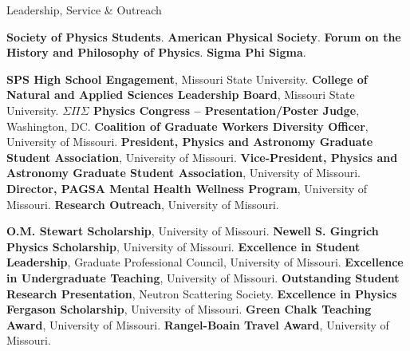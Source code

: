 \begin{rubric}{Leadership, Service \& Outreach}

\entry*[2017--2021] \textbf{Society of Physics Students}.
\entry*[2019--Present] \textbf{American Physical Society}.
\entry*[2020--Present] \textbf{Forum on the History and Philosophy of Physics}.
\entry*[2022--Present] \textbf{Sigma Phi Sigma}.

\entry*[2017--2020] \textbf{SPS High School Engagement}, Missouri State University.
\entry*[2018--2019] \textbf{College of Natural and Applied Sciences Leadership Board}, Missouri State University.
\entry*[2022]       \textbf{$\Sigma \Pi \Sigma$ Physics Congress – Presentation/Poster Judge}, Washington, DC.
\entry*[2022--2023] \textbf{Coalition of Graduate Workers Diversity Officer}, University of Missouri.
\entry*[2022--2023] \textbf{President, Physics and Astronomy Graduate Student Association}, University of Missouri.
\entry*[2023--2024] \textbf{Vice-President, Physics and Astronomy Graduate Student Association}, University of Missouri.
\entry*[2022--2024] \textbf{Director, PAGSA Mental Health Wellness Program}, University of Missouri.
\entry*[2022--2024] \textbf{Research Outreach}, University of Missouri.

\entry*[2021] \textbf{O.M. Stewart Scholarship}, University of Missouri.
\entry*[2022] \textbf{Newell S. Gingrich Physics Scholarship}, University of Missouri.
\entry*[2022] \textbf{Excellence in Student Leadership}, Graduate Professional Council, University of Missouri.
\entry*[2022] \textbf{Excellence in Undergraduate Teaching}, University of Missouri.
\entry*[2023] \textbf{Outstanding Student Research Presentation}, Neutron Scattering Society.
\entry*[2023] \textbf{Excellence in Physics Fergason Scholarship}, University of Missouri.
\entry*[2023] \textbf{Green Chalk Teaching Award}, University of Missouri.
\entry*[2023] \textbf{Rangel-Boain Travel Award}, University of Missouri.

\end{rubric}
